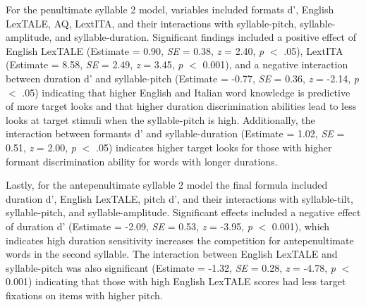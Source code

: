 For the penultimate syllable 2 model, variables included formats d', English LexTALE, AQ, LextITA, and their interactions with syllable-pitch, syllable-amplitude, and syllable-duration. Significant findings included a positive effect of English LexTALE (Estimate = 0.90, \textit{SE} = 0.38, \textit{z} = 2.40, \textit{p} $<$ .05), LextITA (Estimate = 8.58, \textit{SE} = 2.49, \textit{z} = 3.45, \textit{p} $<$ 0.001), and a negative interaction between duration d' and syllable-pitch (Estimate = -0.77, \textit{SE} = 0.36, \textit{z} = -2.14, \textit{p} $<$ .05) indicating that higher English and Italian word knowledge is predictive of more target looks and that higher duration discrimination abilities lead to less looks at target stimuli when the syllable-pitch is high. Additionally, the interaction between formants d' and syllable-duration (Estimate = 1.02, \textit{SE} = 0.51, \textit{z} = 2.00, \textit{p} $<$ .05) indicates higher target looks for those with higher formant discrimination ability for words with longer durations.

Lastly, for the antepenultimate syllable 2 model the final formula included duration d', English LexTALE, pitch d', and their interactions with syllable-tilt, syllable-pitch, and syllable-amplitude. Significant effects included a negative effect of duration d' (Estimate = -2.09, \textit{SE} = 0.53, \textit{z} = -3.95, \textit{p} $<$ 0.001), which indicates high duration sensitivity increases the competition for antepenultimate words in the second syllable. The interaction between English LexTALE and syllable-pitch was also significant (Estimate = -1.32, \textit{SE} = 0.28, \textit{z} = -4.78, \textit{p} $<$ 0.001) indicating that those with high English LexTALE scores had less target fixations on items with higher pitch.

